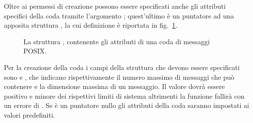 Oltre ai permessi di creazione possono essere specificati anche gli attributi
specifici della coda tramite l'argomento ; quest'ultimo è un
puntatore ad una apposita struttura , la cui definizione è
riportata in fig.~\ref{fig:ipc_mq_attr}.

\begin{figure}[!htb]
  \footnotesize \centering
  \begin{minipage}[c]{0.90\textwidth}
  \end{minipage} 
  \normalsize
  \caption{La struttura , contenente gli attributi di una
    coda di messaggi POSIX.}
  \label{fig:ipc_mq_attr}
\end{figure}

Per la creazione della coda i campi della struttura che devono essere
specificati sono  e , che indicano
rispettivamente il numero massimo di messaggi che può contenere e la
dimensione massima di un messaggio. Il valore dovrà essere positivo e minore
dei rispettivi limiti di sistema altrimenti la funzione fallirà con un errore
di .  Se  è un puntatore nullo gli attributi della
coda saranno impostati ai valori predefiniti.

